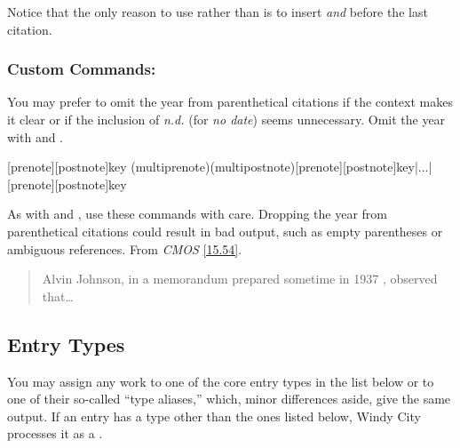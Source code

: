\documentclass[11pt,letterpaper,oneside]{article}
\begin{document}
Notice that the only reason to use  rather than
 is to insert \textit{and} before the last citation.

\subsubsection{Custom Commands: \emph{}}
\label{parenauth}

You may prefer to omit the year from parenthetical citations if the
context makes it clear or if the inclusion of \textit{n.d.} (for
\textit{no date}) seems unnecessary. Omit the year with
 and .

\begin{ltxsyntax}
[prenote][postnote]{key}
(multiprenote)(multipostnote)[prenote][postnote]{key}|...|[prenote][postnote]{key}
\end{ltxsyntax}

As with  and , use these commands
with care. Dropping the year from parenthetical citations could result
in bad output, such as empty parentheses or ambiguous references. From
\textit{CMOS} \ref{15.54}.

\begin{quote}
Alvin Johnson, in a memorandum prepared sometime in 1937
, observed that\ldots
\end{quote}

\subsection{Entry Types}
\label{entrytypes}

You may assign any work to one of the core entry types in the list
below or to one of their so-called ``type aliases,'' which, minor
differences aside, give the same output. If an entry has a type other
than the ones listed below, Windy City processes it as a
.
\end{document}
